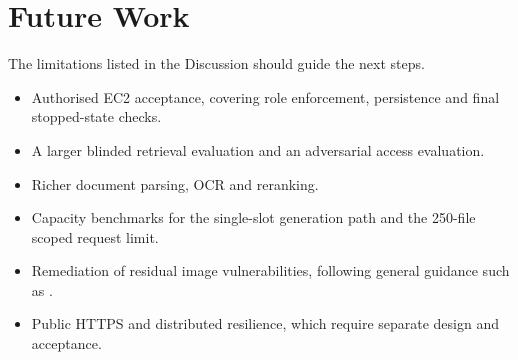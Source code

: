 \section{Future Work}

The limitations listed in the Discussion should guide the next steps.

\begin{itemize}
  \item Authorised EC2 acceptance, covering role enforcement, persistence and final stopped-state checks.
  \item A larger blinded retrieval evaluation and an adversarial access evaluation.
  \item Richer document parsing, OCR and reranking.
  \item Capacity benchmarks for the single-slot generation path and the 250-file scoped request limit.
  \item Remediation of residual image vulnerabilities, following general guidance such as \cite{OWASP}.
  \item Public HTTPS and distributed resilience, which require separate design and acceptance.
\end{itemize}
